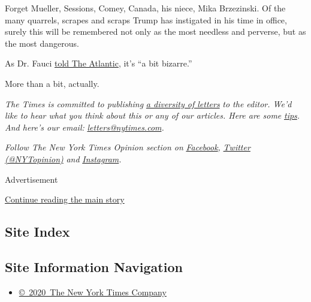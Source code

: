 Forget Mueller, Sessions, Comey, Canada, his niece, Mika Brzezinski. Of
the many quarrels, scrapes and scraps Trump has instigated in his time
in office, surely this will be remembered not only as the most needless
and perverse, but as the most dangerous.

As Dr. Fauci
\href{https://www.theatlantic.com/politics/archive/2020/07/trump-fauci-coronavirus-pandemic-oppo/614224/}{told
The Atlantic}, it's ``a bit bizarre.''

More than a bit, actually.

\emph{The Times is committed to publishing}
\href{https://www.nytimes.com/2019/01/31/opinion/letters/letters-to-editor-new-york-times-women.html}{\emph{a
diversity of letters}} \emph{to the editor. We'd like to hear what you
think about this or any of our articles. Here are some}
\href{https://help.nytimes.com/hc/en-us/articles/115014925288-How-to-submit-a-letter-to-the-editor}{\emph{tips}}\emph{.
And here's our email:}
\href{mailto:letters@nytimes.com}{\emph{letters@nytimes.com}}\emph{.}

\emph{Follow The New York Times Opinion section on}
\href{https://www.facebook.com/nytopinion}{\emph{Facebook}}\emph{,}
\href{http://twitter.com/NYTOpinion}{\emph{Twitter (@NYTopinion)}}
\emph{and}
\href{https://www.instagram.com/nytopinion/}{\emph{Instagram}}\emph{.}

Advertisement

\protect\hyperlink{after-bottom}{Continue reading the main story}

\hypertarget{site-index}{%
\subsection{Site Index}\label{site-index}}

\hypertarget{site-information-navigation}{%
\subsection{Site Information
Navigation}\label{site-information-navigation}}

\begin{itemize}
\tightlist
\item
  \href{https://help.nytimes.com/hc/en-us/articles/115014792127-Copyright-notice}{©~2020~The
  New York Times Company}
\end{itemize}

